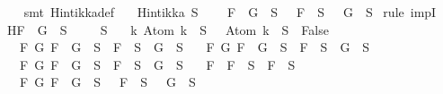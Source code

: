 \begin{isabellebody}
%
\isadelimproof
\ \ %
\endisadelimproof
%
\isatagproof
{}\isamarkupfalse%
\ {\isacharparenleft}smt\ Hintikka{\isacharunderscore}def{\isacharparenright}%
\endisatagproof
{\isafoldproof}%
%
\isadelimproof
\isanewline
%
\endisadelimproof
\isanewline
{}\isamarkupfalse%
\isanewline
\ \ \ {\isachardoublequoteopen}Hintikka\ S{\isachardoublequoteclose}\ \isanewline
\ \ \ {\isachardoublequoteopen}\isactrlbold {\isasymnot}{\isacharparenleft}F\ \isactrlbold {\isasymor}\ G{\isacharparenright}\ {\isasymin}\ S\ {\isasymlongrightarrow}\ \isactrlbold {\isasymnot}\ F\ {\isasymin}\ S\ {\isasymand}\ \isactrlbold {\isasymnot}\ G\ {\isasymin}\ S{\isachardoublequoteclose}\isanewline
%
\isadelimproof
%
\endisadelimproof
%
\isatagproof
{}\isamarkupfalse%
\ {\isacharparenleft}rule\ impI{\isacharparenright}\isanewline
\ \ \isamarkupfalse%
\ H{\isacharcolon}{\isachardoublequoteopen}\isactrlbold {\isasymnot}{\isacharparenleft}F\ \isactrlbold {\isasymor}\ G{\isacharparenright}\ {\isasymin}\ S{\isachardoublequoteclose}\isanewline
\ \isamarkupfalse%
\ {\isachardoublequoteopen}{\isasymbottom}\ {\isasymnotin}\ S\isanewline
\ \ {\isasymand}\ {\isacharparenleft}{\isasymforall}k{\isachardot}\ Atom\ k\ {\isasymin}\ S\ {\isasymlongrightarrow}\ \isactrlbold {\isasymnot}\ {\isacharparenleft}Atom\ k{\isacharparenright}\ {\isasymin}\ S\ {\isasymlongrightarrow}\ False{\isacharparenright}\isanewline
\ \ {\isasymand}\ {\isacharparenleft}{\isasymforall}F\ G{\isachardot}\ F\ \isactrlbold {\isasymand}\ G\ {\isasymin}\ S\ {\isasymlongrightarrow}\ F\ {\isasymin}\ S\ {\isasymand}\ G\ {\isasymin}\ S{\isacharparenright}\isanewline
\ \ {\isasymand}\ {\isacharparenleft}{\isasymforall}F\ G{\isachardot}\ F\ \isactrlbold {\isasymor}\ G\ {\isasymin}\ S\ {\isasymlongrightarrow}\ F\ {\isasymin}\ S\ {\isasymor}\ G\ {\isasymin}\ S{\isacharparenright}\isanewline
\ \ {\isasymand}\ {\isacharparenleft}{\isasymforall}F\ G{\isachardot}\ F\ \isactrlbold {\isasymrightarrow}\ G\ {\isasymin}\ S\ {\isasymlongrightarrow}\ \isactrlbold {\isasymnot}F\ {\isasymin}\ S\ {\isasymor}\ G\ {\isasymin}\ S{\isacharparenright}\isanewline
\ \ {\isasymand}\ {\isacharparenleft}{\isasymforall}F{\isachardot}\ \isactrlbold {\isasymnot}\ {\isacharparenleft}\isactrlbold {\isasymnot}F{\isacharparenright}\ {\isasymin}\ S\ {\isasymlongrightarrow}\ F\ {\isasymin}\ S{\isacharparenright}\isanewline
\ \ {\isasymand}\ {\isacharparenleft}{\isasymforall}F\ G{\isachardot}\ \isactrlbold {\isasymnot}{\isacharparenleft}F\ \isactrlbold {\isasymand}\ G{\isacharparenright}\ {\isasymin}\ S\ {\isasymlongrightarrow}\ \isactrlbold {\isasymnot}\ F\ {\isasymin}\ S\ {\isasymor}\ \isactrlbold {\isasymnot}\ G\ {\isasymin}\ S{\isacharparenright}\isanewline

\end{isabellebody}
